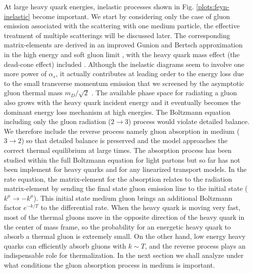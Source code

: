 \documentclass[aps, prc, reprint, amsmath, groupedaddress, nofootinbib]{revtex4-1}
\begin{document}
At large heavy quark energies, inelastic processes shown in Fig. \ref{plots:feyn-inelastic} become important.
We start by considering only the case of gluon emission associated with the scattering with one medium particle, the effective treatment of multiple scatterings will be discussed later.
The corresponding matrix-elements are derived in an improved Gunion and Bertsch approximation in the high energy and soft gluon limit \cite{PhysRevD.25.746,Fochler:2013epa}, with the heavy quark mass effect (the dead-cone effect) included \cite{Uphoff:2014hza}.
Although the inelastic diagrams seem to involve one more power of $\alpha_s$, it actually contributes at leading order to the energy loss due to the small transverse momentum emission that we screened by the asymptotic gluon thermal mass $m_D/\sqrt{2}$ \cite{Ghiglieri:2015ala}.
The available phase space for radiating a gluon also grows with the heavy quark incident energy and it eventually becomes the dominant energy loss mechanism at high energies.
The Boltzmann equation including only the gluon radiation ($2\rightarrow 3$) process would violate detailed balance. We therefore include the reverse process namely gluon absorption in medium ($3\rightarrow 2$) so that detailed balance is preserved and the model approaches the correct thermal equilibrium at large times.
The absorption process has been studied within the full Boltzmann equation \cite{Xu:2004mz} for light partons but so far has not been implement for heavy quarks and for any linearized transport models.
In the rate equation, the matrix-element for the absorption relates to the radiation matrix-element by sending the final state gluon emission line to the initial state ($k^\mu \rightarrow -k^\mu$).
This initial state medium gluon brings an additional Boltzmann factor $e^{-k/T}$ to the differential rate.
When the heavy quark is moving very fast, most of the thermal gluons move in the opposite direction of the heavy quark in the center of mass frame,
so the probability for an energetic heavy quark to absorb a thermal gluon is extremely small. 
On the other hand, low energy heavy quarks can efficiently absorb gluons with $k \sim T$, and the reverse process plays an indispensable role for thermalization. 
In the next section we shall analyze under what conditions the gluon absorption process in medium is important.
\end{document}

